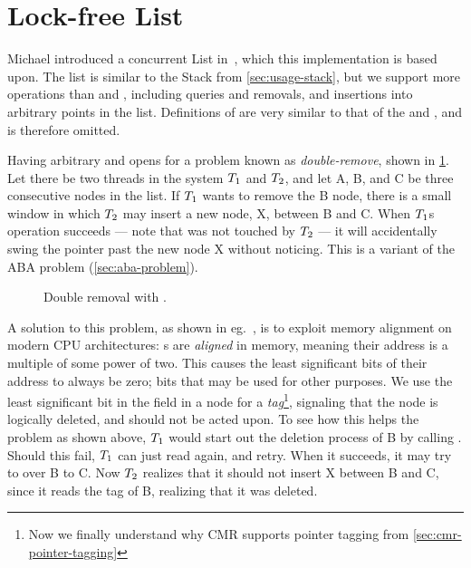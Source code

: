 \section{Lock-free List\label{sec:usage-list}}

Michael introduced a concurrent List in~\cite{harris2001pragmatic}, which this implementation is
based upon. The list is similar to the Stack from \cref{sec:usage-stack}, but we support more
operations than  and , including queries and removals, and insertions into
arbitrary points in the list. Definitions of  are very similar to that of the
 and , and is therefore omitted.

Having arbitrary  and  opens for a problem known as \emph{double-remove},
shown in \cref{fig:list-remove}. Let there be two threads in the system $T\sb{1}$ and $T\sb{2}$,
and let A, B, and C be three consecutive nodes in the list. If $T\sb{1}$ wants to remove the B
node, there is a small window in which $T\sb{2}$ may insert a new node, X, between B and C. When
$T\sb{1}$s  operation succeeds --- note that  was not touched by $T\sb{2}$
--- it will accidentally swing the pointer past the new node X without noticing. This is a variant of
the ABA problem (\cref{sec:aba-problem}).

\begin{figure}[ht]
\centering

\caption{Double removal with \label{fig:list-remove}.}
\end{figure}

A solution to this problem, as shown in eg.~\cite{michael2002high}, is to exploit memory alignment
on modern CPU architectures: s are \emph{aligned} in memory, meaning their address is
a multiple of some power of two. This causes the least significant bits of their address to always
be zero; bits that may be used for other purposes. We use the least significant bit in the
 field in a node for a \emph{tag}\footnote{Now we finally understand why CMR supports
pointer tagging from \cref{sec:cmr-pointer-tagging}}, signaling that the node is logically deleted,
and should not be acted upon. To see how this helps the problem as shown above, $T\sb{1}$ would
start out the deletion process of B by calling . Should this
fail, $T\sb{1}$ can just read  again, and retry. When it succeeds, it may try to
  over B to C. Now $T\sb{2}$ realizes that it should not insert X between B
and C, since it reads the tag of B, realizing that it was deleted.


